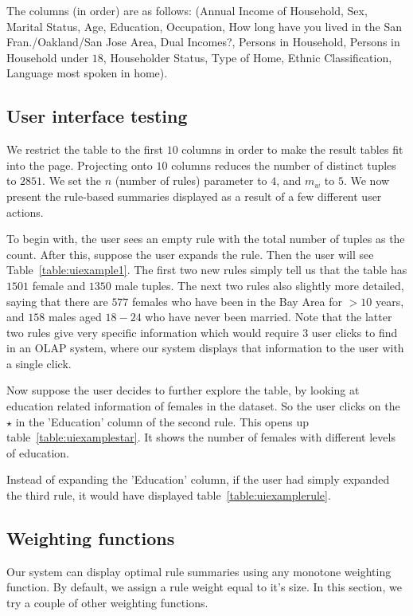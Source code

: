 \documentclass{sig-alternate}
\begin{document}
The columns (in order) are as follows:
(Annual Income of Household, Sex, Marital Status, Age, Education, Occupation, How long have you lived in the San Fran./Oakland/San Jose Area, Dual Incomes?, Persons in Household, Persons in Household under $18$, Householder Status, Type of Home, Ethnic Classification, Language most spoken in home).

\subsection{User interface testing}
We restrict the table to the first $10$ columns in order to make the result tables fit into the page. Projecting onto $10$ columns reduces the number of distinct tuples to $2851$. We set the $n$ (number of rules) parameter to $4$, and $m_w$ to $5$. We now present the rule-based summaries displayed as a result of a few different user actions.

To begin with, the user sees an empty rule with the total number of tuples as the count. After this, suppose the user expands the rule. Then the user will see Table~\ref{table:uiexample1}. The first two new rules simply tell us that the table has $1501$ female and $1350$ male tuples. The next two rules also slightly more detailed, saying that there are $577$ females who have been in the Bay Area for $> 10$ years, and $158$ males aged $18-24$ who have never been married. Note that the latter two rules give very specific information which would require $3$ user clicks to find in an OLAP system, where our system displays that information to the user with a single click. 

Now suppose the user decides to further explore the table, by looking at education related information of females in the dataset. So the user clicks on the $\star$ in the 'Education' column of the second rule. This opens up table~\ref{table:uiexamplestar}. It shows the number of females with different levels of education.

Instead of expanding the 'Education' column, if the user had simply expanded the third rule, it would have displayed table~\ref{table:uiexamplerule}. 

\subsection{Weighting functions}
Our system can display optimal rule summaries using any monotone weighting function. By default, we assign a rule weight equal to it's size. In this section, we try a couple of other weighting functions. 
\end{document}
